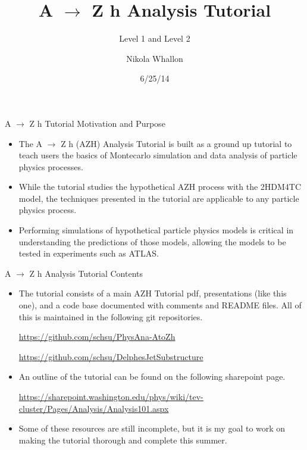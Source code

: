 \documentclass{beamer}
\begin{document}
	\title{A $\rightarrow$ Z h Analysis Tutorial}
	\subtitle{Level 1 and Level 2}
	\author{Nikola Whallon}
	\date{6/25/14}
	\frame{\titlepage}
	\begin{frame}{A $\rightarrow$ Z h Tutorial Motivation and Purpose}
		\begin{itemize}
\item<1->The A $\rightarrow$ Z h (AZH) Analysis Tutorial is built as a ground up tutorial to teach users the basics of Montecarlo simulation and data analysis of particle physics processes.

\bigskip

\item<1->While the tutorial studies the hypothetical AZH process with the 2HDM4TC model, the techniques presented in the tutorial are applicable to any particle physics process.

\bigskip

\item<1->Performing simulations of hypothetical particle physics models is critical in understanding the predictions of those models, allowing the models to be tested in experiments such as ATLAS.
		\end{itemize}
	\end{frame}
	\begin{frame}{A $\rightarrow$ Z h Analysis Tutorial Contents}
		\begin{itemize}
\item<1->The tutorial consists of a main AZH Tutorial pdf, presentations (like this one), and a code base documented with comments and README files. All of this is maintained in the following git repositories.

\bigskip

\url{https://github.com/schsu/PhysAna-AtoZh}

\url{https://github.com/schsu/DelphesJetSubstructure}

\bigskip

\item<1->An outline of the tutorial can be found on the following sharepoint page.

\bigskip

\url{https://sharepoint.washington.edu/phys/wiki/tev-cluster/Pages/Analysis/Analysis101.aspx}

\bigskip

\item<1->Some of these resources are still incomplete, but it is my goal to work on making the tutorial thorough and complete this summer.
		\end{itemize}
	\end{frame}
\end{document}
